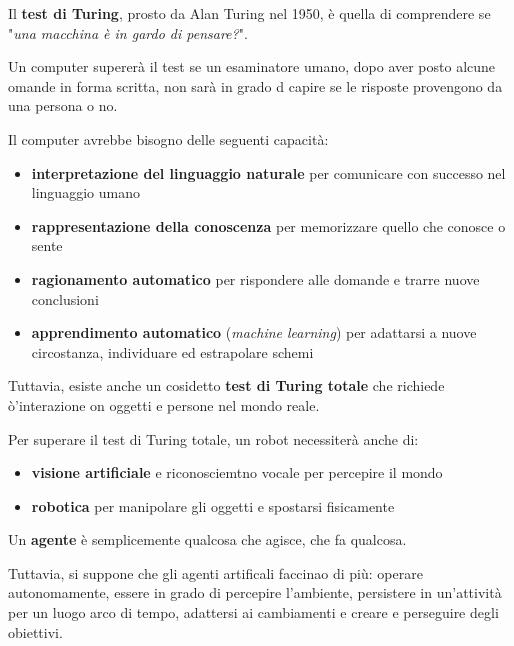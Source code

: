\documentclass[a4paper, 12pt]{book}
\begin{document}
    \begin{tcolorbox}[
      colback=cyan!5!white,
      colframe=blue!50!black,
      title=\textbf{Test di Turing},
      coltitle=white,
      fonttitle=\bfseries,
      arc=3mm,
      boxrule=0.5pt,
      enhanced,
      breakable
    ]
      Il \textbf{test di Turing}, prosto da Alan Turing nel 1950, è quella di comprendere se "\textit{una macchina è in gardo di pensare?}".

      Un computer supererà il test se un esaminatore umano, dopo aver posto alcune omande in forma scritta, non sarà in grado d capire se le risposte provengono da una persona o no.
      
      Il computer avrebbe bisogno delle seguenti capacità:
      \begin{itemize}
        \item \textbf{interpretazione del linguaggio naturale} per comunicare con successo nel linguaggio umano
        \item \textbf{rappresentazione della conoscenza} per memorizzare quello che conosce o sente
        \item \textbf{\textbf{ragionamento automatico}} per rispondere alle domande e trarre nuove conclusioni
        \item \textbf{apprendimento automatico} (\textit{machine learning}) per adattarsi a nuove circostanza, individuare ed estrapolare schemi
      \end{itemize}

      Tuttavia, esiste anche un cosidetto \textbf{test di Turing totale} che richiede ò'interazione on oggetti e persone nel mondo reale.

      Per superare il test di Turing totale, un robot necessiterà anche di:
      \begin{itemize}
        \item \textbf{visione artificiale} e riconosciemtno vocale per percepire il mondo
        \item \textbf{robotica} per manipolare gli oggetti e spostarsi fisicamente
      \end{itemize}
    \end{tcolorbox}

    Un \textbf{agente} è semplicemente qualcosa che agisce, che fa qualcosa.

    Tuttavia, si suppone che gli agenti artificali faccinao di più: operare autonomamente, essere in grado di percepire l'ambiente, persistere in un'attività per un luogo arco di tempo, adattersi ai cambiamenti e creare e perseguire degli obiettivi.
\end{document}
